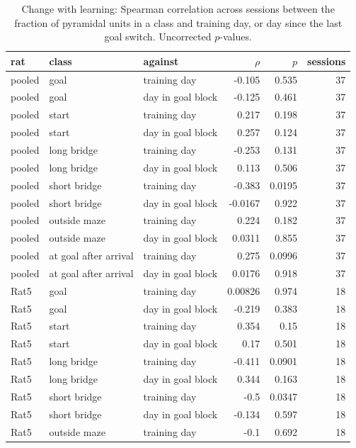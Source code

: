 \begin{table}[htbp]
\centering
\scriptsize
\caption{Change with learning: Spearman correlation across sessions between the fraction of pyramidal units in a class and training day, or day since the last goal switch. Uncorrected $p$-values.}
\label{tab:cell_classes:trends}
\begin{tabular}{lllrrr}
\toprule
rat & class & against & $\rho$ & $p$ & sessions \\
\midrule
pooled & goal & training day & -0.105 & 0.535 & 37 \\
pooled & goal & day in goal block & -0.125 & 0.461 & 37 \\
pooled & start & training day & 0.217 & 0.198 & 37 \\
pooled & start & day in goal block & 0.257 & 0.124 & 37 \\
pooled & long bridge & training day & -0.253 & 0.131 & 37 \\
pooled & long bridge & day in goal block & 0.113 & 0.506 & 37 \\
pooled & short bridge & training day & -0.383 & 0.0195 & 37 \\
pooled & short bridge & day in goal block & -0.0167 & 0.922 & 37 \\
pooled & outside maze & training day & 0.224 & 0.182 & 37 \\
pooled & outside maze & day in goal block & 0.0311 & 0.855 & 37 \\
pooled & at goal after arrival & training day & 0.275 & 0.0996 & 37 \\
pooled & at goal after arrival & day in goal block & 0.0176 & 0.918 & 37 \\
Rat5 & goal & training day & 0.00826 & 0.974 & 18 \\
Rat5 & goal & day in goal block & -0.219 & 0.383 & 18 \\
Rat5 & start & training day & 0.354 & 0.15 & 18 \\
Rat5 & start & day in goal block & 0.17 & 0.501 & 18 \\
Rat5 & long bridge & training day & -0.411 & 0.0901 & 18 \\
Rat5 & long bridge & day in goal block & 0.344 & 0.163 & 18 \\
Rat5 & short bridge & training day & -0.5 & 0.0347 & 18 \\
Rat5 & short bridge & day in goal block & -0.134 & 0.597 & 18 \\
Rat5 & outside maze & training day & -0.1 & 0.692 & 18 \\

\end{tabular}
\end{table}
